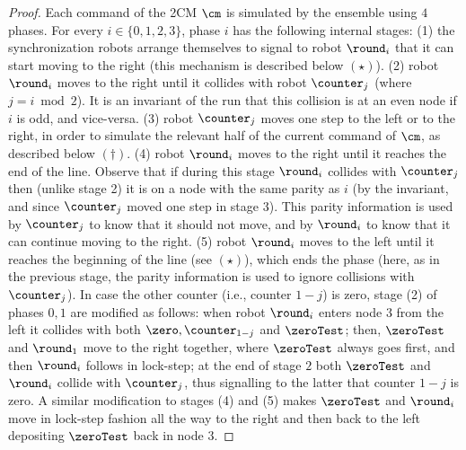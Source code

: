 \begin{proof}
Each command of the 2CM $\cm$ is simulated by the ensemble using $4$ phases. For every $i \in \{0,1,2,3\}$, phase $i$ has the following internal stages: (1) the synchronization robots arrange themselves to signal to robot $\round_i$ that it can start moving to the right (this mechanism is described below $(\star)$). (2) robot $\round_i$ moves to the right until it collides with robot $\counter_j$ (where $j = i \bmod 2$). It is an invariant of the run that this collision is at an even node if $i$ is odd, and vice-versa. (3) robot $\counter_j$ moves one step to the left or to the right, in order to simulate the relevant half of the current command of $\cm$, as described below $(\dagger)$. (4) robot $\round_i$ moves to the right until it reaches the end of the line. Observe that if during this stage $\round_i$ collides with $\counter_j$ then (unlike stage 2) it is on a node with the same parity as $i$ (by the invariant, and since $\counter_j$ moved one step in stage 3). This parity information is used by $\counter_j$ to know that it should not move, and by $\round_i$ to know that it can continue moving to the right. (5) robot $\round_i$ moves to the left until it reaches the beginning of the line (see $(\star)$), which ends the phase (here, as in the previous stage, the parity information is used to ignore collisions with $\counter_j$). In case the other counter (i.e., counter $1-j$) is zero, stage (2) of phases $0,1$ are modified as follows: when robot $\round_i$ enters node $3$ from the left it collides with both $\zero, \counter_{1-j}$ and $\zeroTest$; then, $\zeroTest$ and $\round_1$ move to the right together, where $\zeroTest$ always goes first, and then $\round_i$ follows in lock-step; at the end of stage $2$ both $\zeroTest$ and $\round_i$ collide with $\counter_j$, thus signalling to the latter that counter $1-j$ is zero. A similar modification to stages (4) and (5) makes $\zeroTest$ and $\round_i$ move in lock-step fashion all the way to the right and then back to the left depositing $\zeroTest$ back in node $3$.
%



\end{proof}
